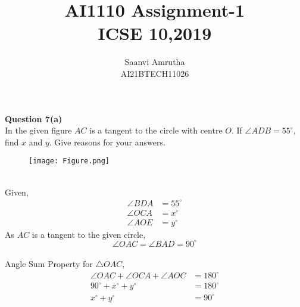 \documentclass[journal,12pt,twocolumn]{IEEEtran}
\begin{document}
\makeatletter
{}
\makeatother
\let\StandardTheFigure\thefigure
\let\vec\mathbf
\makeatletter 
\renewcommand{\thefigure}{S\@arabic\c@figure}
\makeatother
\renewcommand{\thefigure}{\theproblem}
\def\putbox#1#2#3{\makebox[0in][l]{\makebox[#1][l]{}\raisebox{\baselineskip}[0in][0in]{\raisebox{#2}[0in][0in]{#3}}}}
     \def\rightbox#1{\makebox[0in][r]{#1}}
     \def\centbox#1{\makebox[0in]{#1}}
     \def\topbox#1{\raisebox{-\baselineskip}[0in][0in]{#1}}
     \def\midbox#1{\raisebox{-0.5\baselineskip}[0in][0in]{#1}}
\vspace{3cm}
       
\title{AI1110 Assignment-1 \\ ICSE 10,2019} 
\author{Saanvi Amrutha\\AI21BTECH11026} 
    
\maketitle
\newpage
\bigskip

\textbf{Question 7(a)}\\ 
 \text In the given figure $AC$ is a tangent to the circle with centre $O$. If $\angle ADB=55^\circ$, find $x$ and $y$. Give reasons for your answers.\\

 \begin{figure}[h]
\texttt{[image: Figure.png]}
\end{figure}

\solution \\
Given,  
\begin{align}
                   \angle BDA&=55^\circ \\ 
                   \angle OCA&=x^\circ\\
                   \angle AOE&=y^\circ
                    \end{align} 
As $AC$ is a tangent to the given circle, 
\begin{equation} 
\angle OAC=\angle BAD=90^\circ
\end{equation} 
\\
Angle Sum Property for $\triangle OAC$, 
        \begin{align}
           \angle OAC+\angle OCA+\angle AOC&=180^\circ \\
             90^\circ+x^\circ+y^\circ&=180^\circ\\
          x^\circ+y^\circ&=90^\circ
               \end{align} 
             
\end{document}
